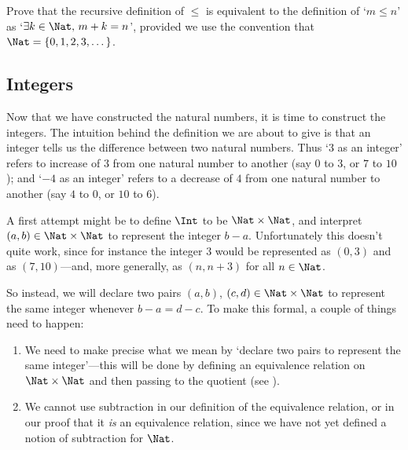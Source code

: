 \begin{exercise}
\label{exTwoDefinitionsOfLeqOnN}
Prove that the recursive definition of $\le$ is equivalent to the definition of `$m \le n$' as `$\exists k \in \Nat,\, m+k=n$', provided we use the convention that $\Nat = \{ 0, 1, 2, 3, \dots \}$.
\end{exercise}

\subsection*{Integers}

Now that we have constructed the natural numbers, it is time to construct the integers. The intuition behind the definition we are about to give is that an integer tells us the difference between two natural numbers. Thus `$3$ as an integer' refers to increase of $3$ from one natural number to another (say $0$ to $3$, or $7$ to $10$); and `$-4$ as an integer' refers to a decrease of $4$ from one natural number to another (say $4$ to $0$, or $10$ to $6$).

A first attempt might be to define $\Int$ to be $\Nat \times \Nat$, and interpret $(a,b) \in \Nat \times \Nat$ to represent the integer $b-a$. Unfortunately this doesn't quite work, since for instance the integer $3$ would be represented as $(0,3)$ and as $(7,10)$---and, more generally, as $(n,n+3)$ for all $n \in \Nat$.

So instead, we will declare two pairs $(a,b)$, $(c,d) \in \Nat \times \Nat$ to represent the same integer whenever $b-a = d-c$. To make this formal, a couple of things need to happen:
\begin{enumerate}[(1)]
\item We need to make precise what we mean by `declare two pairs to represent the same integer'---this will be done by defining an equivalence relation on $\Nat \times \Nat$ and then passing to the quotient (see ).
\item We cannot use subtraction in our definition of the equivalence relation, or in our proof that it \textit{is} an equivalence relation, since we have not yet defined a notion of subtraction for $\Nat$.
\end{enumerate}

